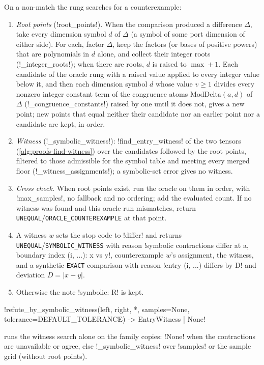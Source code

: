 On a non-match the rung searches for a counterexample:
\begin{enumerate}
\item \emph{Root points} (\py!root_points!). When the comparison produced a difference $\Delta$, take every dimension symbol $d$ of $\Delta$ (a symbol of some port dimension of either side). For each, factor $\Delta$, keep the factors (or bases of positive powers) that are polynomials in $d$ alone, and collect their integer roots (\py!_integer_roots!); when there are roots, $d$ is raised to $\max+1$. Each candidate of the oracle rung with a raised value applied to every integer value below it, and then each dimension symbol $d$ whose value $v\ge1$ divides every nonzero integer constant term of the congruence atoms $\mathrm{ModDelta}(a,d)$ of $\Delta$ (\py!_congruence_constants!) raised by one until it does not, gives a new point; new points that equal neither their candidate nor an earlier point nor a candidate are kept, in order.
\item \emph{Witness} (\py!_symbolic_witness!): \py!find_entry_witness! of the two tensors (\cref{alg:proofs-find-witness}) over the candidates followed by the root points, filtered to those admissible for the symbol table and meeting every merged floor (\py!_witness_assignments!); a symbolic-set error gives no witness.
\item \emph{Cross check.} When root points exist, run the oracle on them in order, with \py!max_samples!, no fallback and no ordering; add the evaluated count. If no witness was found and this oracle run mismatches, return \texttt{UNEQUAL}/\allowbreak\texttt{ORACLE\_COUNTEREXAMPLE} at that point.
\item A witness $w$ sets the stop code to \code!differ! and returns \texttt{UNEQUAL}/\allowbreak\texttt{SYMBOLIC\_WITNESS} with reason \code!symbolic contractions differ at {a}, boundary index (i, ...): x vs y!, counterexample $w$'s assignment, the witness, and a synthetic \texttt{EXACT} comparison with reason \code!entry (i, ...) differs by D! and deviation $D=|x-y|$.
\item Otherwise the note \code!symbolic: R! is kept.
\end{enumerate}

\begin{signature}
\py!refute_by_symbolic_witness(left, right, *, samples=None, tolerance=DEFAULT_TOLERANCE) -> EntryWitness | None!
\end{signature}
runs the witness search alone on the family copies: \py!None! when the contractions are unavailable or agree, else \py!_symbolic_witness! over \py!samples! or the sample grid (without root points).

